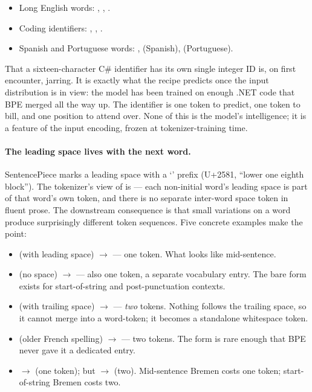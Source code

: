 \begin{itemize}[leftmargin=1.5em,itemsep=0.2em]
\item Long English words: ,
  , .
\item Coding identifiers: ,
  , .
\item Spanish and Portuguese words: ,
   (Spanish), 
  (Portuguese).
\end{itemize}

\noindent
That a sixteen-character C\# identifier has its own single
integer ID is, on first encounter, jarring. It is exactly what
the recipe predicts once the input distribution is in view: the
model has been trained on enough .NET code that BPE merged
 all the way up. The identifier is one
token to predict, one token to bill, and one position to attend
over. None of this is the model's intelligence; it is a feature
of the input encoding, frozen at tokenizer-training time.

\paragraph{The leading space lives with the next word.}
SentencePiece marks a leading space with a `' prefix
(U+2581, ``lower one eighth block''). The tokenizer's view of
 is
\code{[Switzerland][▁is][▁Bern]} --- each non-initial word's
leading space is part of that word's own token, and there is no
separate inter-word space token in fluent prose. The downstream
consequence is that small variations on a word produce
surprisingly different token sequences. Five concrete examples
make the point:

\begin{itemize}[leftmargin=1.5em,itemsep=0.2em]
\item {} (with leading space)
  $\to$ \code{[▁Bern]} --- one token. What  looks like
  mid-sentence.
\item {} (no space)
  $\to$ \code{[Bern]} --- also one token, a separate vocabulary
  entry. The bare form exists for start-of-string and
  post-punctuation contexts.
\item {} (with trailing space)
  $\to$ \code{[Bern][▁]} --- \emph{two} tokens. Nothing follows
  the trailing space, so it cannot merge into a word-token; it
  becomes a standalone whitespace token.
\item {} (older French spelling)
  $\to$ \code{[Ber][ne]} --- two tokens. The form is rare enough
  that BPE never gave it a dedicated entry.
\item {} $\to$ \code{[▁Bremen]} (one token); but
   $\to$ \code{[B][remen]} (two). Mid-sentence
  Bremen costs one token; start-of-string Bremen costs two.
\end{itemize}

